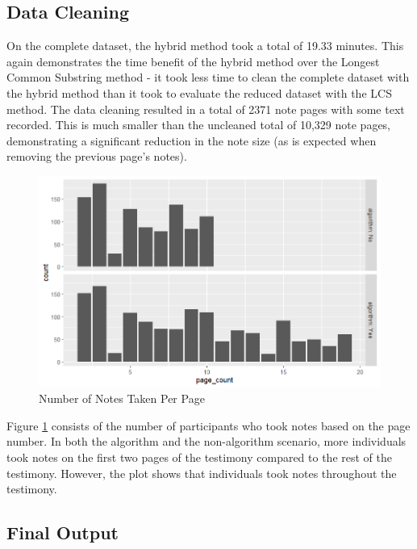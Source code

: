 \documentclass[print]{nuthesis}
\begin{document}
\hypertarget{data-cleaning-1}{%
\subsection{Data Cleaning}\label{data-cleaning-1}}

On the complete dataset, the hybrid method took a total of 19.33 minutes.
This again demonstrates the time benefit of the hybrid method over the Longest Common Substring method - it took less time to clean the complete dataset with the hybrid method than it took to evaluate the reduced dataset with the LCS method.
The data cleaning resulted in a total of 2371 note pages with some text recorded.
This is much smaller than the uncleaned total of 10,329 note pages, demonstrating a significant reduction in the note size (as is expected when removing the previous page's notes).

\begin{figure}

{\centering \includegraphics[width=\linewidth]{images/freq_barchart} 

}

\caption{Number of Notes Taken Per Page}\label{fig:notecount}
\end{figure}

Figure \ref{fig:notecount} consists of the number of participants who took notes based on the page number.
In both the algorithm and the non-algorithm scenario, more individuals took notes on the first two pages of the testimony compared to the rest of the testimony.
However, the plot shows that individuals took notes throughout the testimony.

\hypertarget{final-output}{%
\subsection{Final Output}\label{final-output}}
\end{document}
